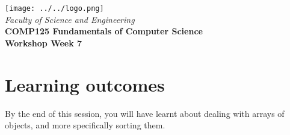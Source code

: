 \usepackage[T1]{fontenc}
\usepackage{pslatex}
 \usepackage[pdftex]{color}  
 \usepackage[pdftex]{graphicx}     
\usepackage{verbatim}
\usepackage{xcolor}
\usepackage{paralist}
\usepackage{tagging}

\usepackage[colorlinks=true,urlcolor=red]{hyperref}
\setlength{\topmargin}{-0.5in}                  %
\setlength{\textheight}{9.5in}                  %
\setlength{\oddsidemargin}{0in}                 %
\setlength{\evensidemargin}{0in}                %
\setlength{\textwidth}{6.5in}                   %
\setlength{\parindent}{0.0in}
\newcommand{\code}{\texttt}

\usepackage{listings}




%
\vspace{0.2in}
\begin{center}
        {\large  %
\texttt{[image: ../../logo.png]}\\
\medskip
        {\it  Faculty of Science and Engineering\\}
        \vspace{0.2in}
         {\bf COMP125 Fundamentals of Computer Science\\
        Workshop Week 7\\}}
\end{center}
\vspace{0.3in}
%

\renewcommand{\labelenumi}{\alph{enumi}.}
 
\section* {Learning outcomes}

By the end of this session, you will have learnt about dealing with arrays of objects, and more specifically sorting them. 

